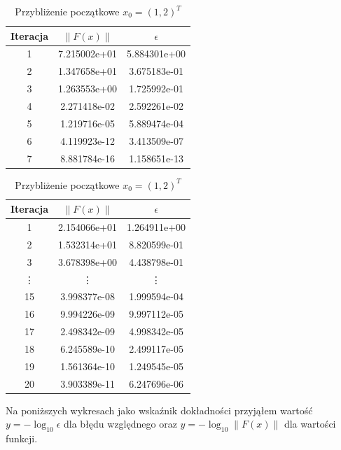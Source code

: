 \documentclass[11pt,wide]{mwart}
\begin{document}
\begin{center}
\begin{table}[!htb]
\caption{Porównanie zbieżności metody Newtona}
    \begin{subtable}{.5\linewidth}
      \centering
      \caption{Obserwowana zbieżność kwadratowa dla funkcji $ F_1 $}
\begin{tabular}{| c | c | c |} \hline
Iteracja & $\|F(x)\|$ & $\epsilon$ \\ \hline
1 & 7.215002e+01 & 5.884301e+00 \\ 
2 & 1.347658e+01 & 3.675183e-01 \\ 
3 & 1.263553e+00 & 1.725992e-01 \\ 
4 & 2.271418e-02 & 2.592261e-02 \\ 
5 & 1.219716e-05 & 5.889474e-04 \\ 
6 & 4.119923e-12 & 3.413509e-07 \\ 
7 & 8.881784e-16 & 1.158651e-13 \\  \hline
\end{tabular}
      \caption*{Przybliżenie początkowe $ x_0 = (1, 1)^T $}
\end{subtable}%
\begin{subtable}{.5\linewidth}
\centering
\caption{Obserwowana zbieżność liniowa dla funkcji $ F_5 $}
\begin{tabular}{ |c | c | c| } \hline
Iteracja & $\|F(x)\|$ & $\epsilon$ \\ \hline
1 & 2.154066e+01 & 1.264911e+00 \\ 
2 & 1.532314e+01 & 8.820599e-01 \\ 
3 & 3.678398e+00 & 4.438798e-01 \\ 
\vdots & \vdots & \vdots \\
15 & 3.998377e-08 & 1.999594e-04 \\ 
16 & 9.994226e-09 & 9.997112e-05 \\ 
17 & 2.498342e-09 & 4.998342e-05 \\ 
18 & 6.245589e-10 & 2.499117e-05 \\ 
19 & 1.561364e-10 & 1.249545e-05 \\ 
20 & 3.903389e-11 & 6.247696e-06 \\  \hline
\end{tabular}
\caption*{Przybliżenie początkowe $ x_0 = (1, 2)^T $}
\end{subtable}
\end{table}
\end{center}

Na poniższych wykresach jako wskaźnik dokładności przyjąłem wartość $ y = -\log_{10}\epsilon $ dla błędu względnego oraz $ y = -\log_{10}\|F(x)\| $ dla wartości funkcji.
\end{document}
